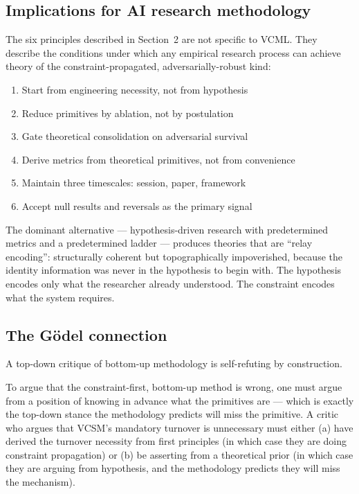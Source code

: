 \documentclass[11pt,a4paper]{article}
\begin{document}
\subsection{Implications for AI research methodology}

The six principles described in Section~2 are not specific to VCML.
They describe the conditions under which any empirical research process
can achieve theory of the constraint-propagated, adversarially-robust kind:

\begin{enumerate}[label=\arabic*.]
  \item Start from engineering necessity, not from hypothesis
  \item Reduce primitives by ablation, not by postulation
  \item Gate theoretical consolidation on adversarial survival
  \item Derive metrics from theoretical primitives, not from convenience
  \item Maintain three timescales: session, paper, framework
  \item Accept null results and reversals as the primary signal
\end{enumerate}

The dominant alternative --- hypothesis-driven research with predetermined
metrics and a predetermined ladder --- produces theories that are
``relay encoding'': structurally coherent but topographically impoverished,
because the identity information was never in the hypothesis to begin with.
The hypothesis encodes only what the researcher already understood.
The constraint encodes what the system requires.

\subsection{The Gödel connection}

A top-down critique of bottom-up methodology is self-refuting by construction.

To argue that the constraint-first, bottom-up method is wrong, one must argue
from a position of knowing in advance what the primitives are --- which is
exactly the top-down stance the methodology predicts will miss the primitive.
A critic who argues that VCSM's mandatory turnover is unnecessary must either
(a) have derived the turnover necessity from first principles (in which case
they are doing constraint propagation) or (b) be asserting from a theoretical
prior (in which case they are arguing from hypothesis, and the methodology
predicts they will miss the mechanism).
\end{document}
